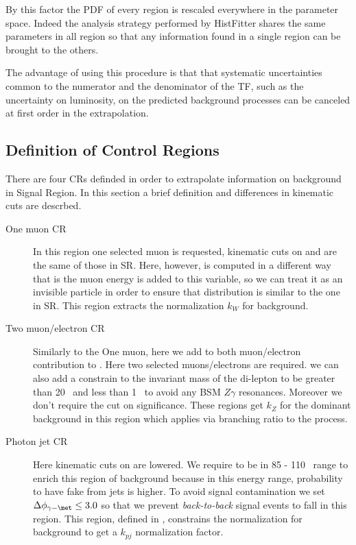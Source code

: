 \begin{description}
By this factor the PDF of every region is rescaled everywhere in the parameter space. Indeed the analysis strategy performed by HistFitter shares the same parameters in all region so that any information found in a single region can be brought to the others.

The advantage of using this procedure is that that systematic uncertainties common to the numerator and the denominator of the TF, such as the uncertainty on luminosity, on the predicted background processes can be canceled at first order in the extrapolation.

\subsection{Definition of Control Regions}
There are four CRs definded in order to extrapolate information on background in Signal Region. In this section a brief definition and differences in kinematic cuts are descrbed.

\begin{description}
\item [One muon CR] In this region one selected muon is requested, kinematic cuts on \pt and \met are the same of those in SR. Here, however, \met is computed in a different way that is the muon energy is added to this variable, so we can treat it as an invisible particle in order to ensure that \met distribution is similar to the one in SR. This region extracts the normalization $k_W$ for \wg background.
\item [Two muon/electron CR] Similarly to the One muon, here we add to \met both muon/electron contribution to \met. Here two selected muons/electrons are required. we can also add a constrain to the invariant mass of the di-lepton to be greater than 20 \GeV\, and less than 1 \TeV \, to avoid any BSM $Z\gamma$ resonances. Moreover we don't require the cut on \met significance. These regions get $k_Z$ for the dominant background \zg in this region which applies via branching ratio to the \znng process.
\item [Photon jet CR] Here kinematic cuts on \met are lowered. We require \met to be in 85 - 110 \GeV\, range to enrich this region of \gj background because in this energy range, probability to have fake \met from jets is higher. To avoid signal contamination we set $\Delta\phi_{\gamma - \met} \le 3.0$ so that we prevent {\itshape back-to-back} signal events to fall in this region. This region, defined in \RunTwo, constrains the normalization for \gj background to get a $k_{pj}$ normalization factor.
\end{description}


\end{description}
